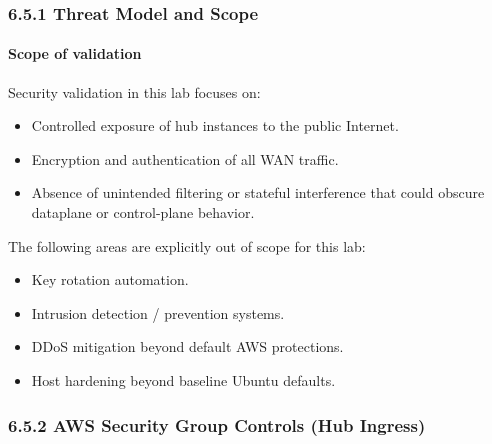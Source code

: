 \documentclass[11pt]{article}
\begin{document}
%
%
%
\subsubsection{6.5.1 Threat Model and Scope}

\paragraph{Scope of validation}
Security validation in this lab focuses on:
\begin{itemize}
  \item Controlled exposure of hub instances to the public Internet.
  \item Encryption and authentication of all WAN traffic.
  \item Absence of unintended filtering or stateful interference that could obscure dataplane or control-plane behavior.
\end{itemize}

The following areas are explicitly out of scope for this lab:
\begin{itemize}
  \item Key rotation automation.
  \item Intrusion detection / prevention systems.
  \item DDoS mitigation beyond default AWS protections.
  \item Host hardening beyond baseline Ubuntu defaults.
\end{itemize}

%
%
%
\subsubsection{6.5.2 AWS Security Group Controls (Hub Ingress)}
\end{document}
